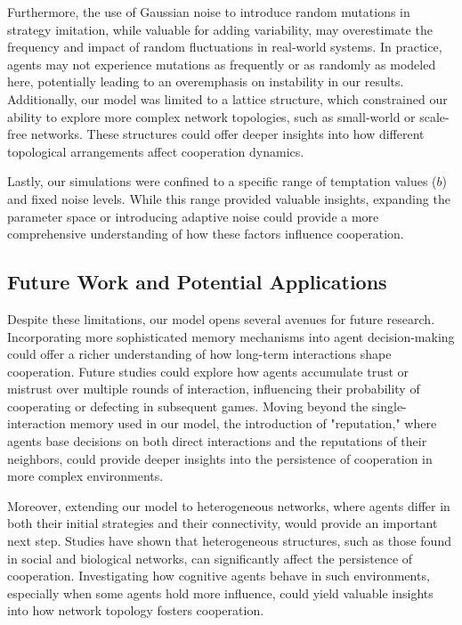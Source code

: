 \documentclass[runningheads]{llncs}
\begin{document}
Furthermore, the use of Gaussian noise to introduce random mutations in strategy imitation, while valuable for adding variability, may overestimate the frequency and impact of random fluctuations in real-world systems. In practice, agents may not experience mutations as frequently or as randomly as modeled here, potentially leading to an overemphasis on instability in our results. Additionally, our model was limited to a lattice structure, which constrained our ability to explore more complex network topologies, such as small-world or scale-free networks. These structures could offer deeper insights into how different topological arrangements affect cooperation dynamics.

Lastly, our simulations were confined to a specific range of temptation values (\( b \)) and fixed noise levels. While this range provided valuable insights, expanding the parameter space or introducing adaptive noise could provide a more comprehensive understanding of how these factors influence cooperation.

\subsection{Future Work and Potential Applications}
Despite these limitations, our model opens several avenues for future research. Incorporating more sophisticated memory mechanisms into agent decision-making could offer a richer understanding of how long-term interactions shape cooperation. Future studies could explore how agents accumulate trust or mistrust over multiple rounds of interaction, influencing their probability of cooperating or defecting in subsequent games. Moving beyond the single-interaction memory used in our model, the introduction of "reputation," where agents base decisions on both direct interactions and the reputations of their neighbors, could provide deeper insights into the persistence of cooperation in more complex environments.

Moreover, extending our model to heterogeneous networks, where agents differ in both their initial strategies and their connectivity, would provide an important next step. Studies have shown that heterogeneous structures, such as those found in social and biological networks, can significantly affect the persistence of cooperation. Investigating how cognitive agents behave in such environments, especially when some agents hold more influence, could yield valuable insights into how network topology fosters cooperation.
\end{document}
